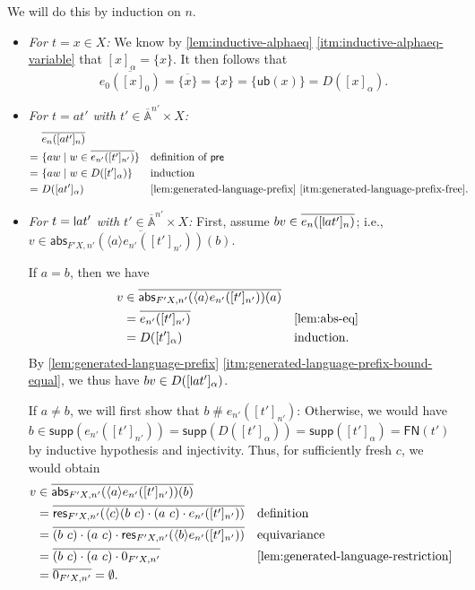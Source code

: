 \documentclass[a4paper,UKenglish,cleveref,thm-restate,numberwithinsect,final]{lipics-v2021}
\newcommand{\pre}{\mathsf{pre}}
\newcommand{\abs}{\mathsf{abs}}
\newcommand{\res}{\mathsf{res}}
\newcommand{\FN}{\mathsf{FN}}
\newcommand{\Names}{\mathbb{A}}
\newcommand{\barNames}{\overline{\Names}}
\newcommand{\fresh}{\mathbin{\#}}
\newcommand{\supp}{\mathsf{supp}}
\newcommand{\bind}[1]{\langle #1\rangle}
\theoremstyle{plain}
\newcommand{\midmid}{\hspace{0.2ex}{\rule[-0.1ex]{0.6pt}{1.65ex}}\hspace{0.2ex}}
\newcommand{\newletter}[1]{{\midmid}#1}
\newcommand{\ub}{\mathsf{ub}}
\numberwithin{equation}{section}
\newcommand{\+}[1]{\mathcal{#1}\xspace}
\theoremstyle{definition}
\begin{document}
We will do this by induction on \(n\).
\begin{itemize}
  \item \emph{For \(t = x \in X\):}
    We know by \cref{lem:inductive-alphaeq} \eqref{itm:inductive-alphaeq-variable} that \([x]_\alpha = \{x\}\).
    It then follows that
    \begin{equation*}
      \overline{e_0([x]_0)} = \overline{\{x\}} = \{x\} = \{\ub(x)\} = D([x]_\alpha).
    \end{equation*}
  \item \emph{For \(t = at'\) with \(t' \in \barNames^{n'} \times X\):}
    \begin{align*}
      &\overline{e_n([at']_n)} \\
      =~&\{aw \mid w \in \overline{e_{n'}([t']_{n'})}\} && \text{definition of } \pre \\
      =~&\{aw \mid w \in D([t']_\alpha)\} && \text{induction} \\
      =~&D([at']_\alpha) && \text{\cref{lem:generated-language-prefix} \eqref{itm:generated-language-prefix-free}}.
    \end{align*}
  \item \emph{For \(t = \newletter{a}t'\) with \(t' \in \barNames^{n'} \times X\):}
    First, assume \(bv \in \overline{e_n([\newletter{a}t']_n)}\); i.e., \(v \in \overline{\abs_{F'X, n'}(\bind{a} e_{n'}([t']_{n'}))(b)}\).

    If \(a = b\), then we have
    \begin{align*}
      v &\in \overline{\abs_{F'X, n'}(\bind{a} e_{n'}([t']_{n'}))(a)} \\
      &= \overline{e_{n'}([t']_{n'})} && \text{\cref{lem:abs-eq}} \\
      &= D([t']_\alpha) && \text{induction}.
    \end{align*}
    By \cref{lem:generated-language-prefix} \eqref{itm:generated-language-prefix-bound-equal}, we thus have \(bv \in D([\newletter{a}t']_\alpha)\).

    If \(a \neq b\), we will first show that \(b \fresh e_{n'}([t']_{n'})\):
    Otherwise, we would have \(b \in \supp(e_{n'}([t']_{n'})) = \supp(D([t']_\alpha)) = \supp([t']_\alpha) = \FN(t')\) by inductive hypothesis and injectivity.
    Thus, for sufficiently fresh \(c\), we would obtain
    \begin{align*}
      v &\in \overline{\abs_{F'X, n'}(\bind{a} e_{n'}([t']_{n'}))(b)} \\
      &= \overline{\res_{F' X, n'}(\bind{c} (b\ c) \cdot (a\ c) \cdot e_{n'}([t']_{n'}))} && \text{definition} \\
      &= \overline{(b\ c) \cdot (a\ c) \cdot \res_{F' X, n'}(\bind{b} e_{n'}([t']_{n'}))} && \text{equivariance} \\
      &= \overline{(b\ c) \cdot (a\ c) \cdot 0_{F'X, n'}} && \text{\cref{lem:generated-language-restriction}} \\
      &= \overline{0_{F'X, n'}} = \emptyset.
    \end{align*}


\end{itemize}
\end{document}
